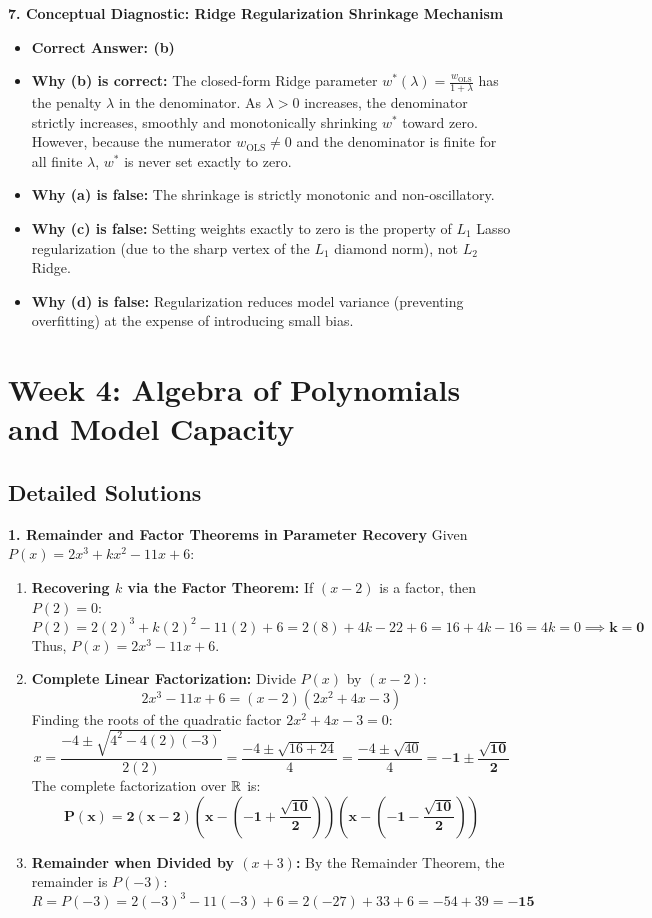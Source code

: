 \textbf{7. Conceptual Diagnostic: Ridge Regularization Shrinkage Mechanism}
\begin{itemize}
    \item \textbf{Correct Answer: (b)}
    \item \textbf{Why (b) is correct:} The closed-form Ridge parameter $w^*(\lambda) = \frac{w_{\text{OLS}}}{1 + \lambda}$ has the penalty $\lambda$ in the denominator. As $\lambda > 0$ increases, the denominator strictly increases, smoothly and monotonically shrinking $w^*$ toward zero. However, because the numerator $w_{\text{OLS}} \neq 0$ and the denominator is finite for all finite $\lambda$, $w^*$ is never set exactly to zero.
    \item \textbf{Why (a) is false:} The shrinkage is strictly monotonic and non-oscillatory.
    \item \textbf{Why (c) is false:} Setting weights exactly to zero is the property of $L_1$ Lasso regularization (due to the sharp vertex of the $L_1$ diamond norm), not $L_2$ Ridge.
    \item \textbf{Why (d) is false:} Regularization reduces model variance (preventing overfitting) at the expense of introducing small bias.
\end{itemize}

\section*{Week 4: Algebra of Polynomials and Model Capacity}

\subsection*{Detailed Solutions}

\textbf{1. Remainder and Factor Theorems in Parameter Recovery}
Given $P(x) = 2x^3 + k x^2 - 11x + 6$:
\begin{enumerate}
    \item \textbf{Recovering $k$ via the Factor Theorem:}
    If $(x - 2)$ is a factor, then $P(2) = 0$:
    $$P(2) = 2(2)^3 + k(2)^2 - 11(2) + 6 = 2(8) + 4k - 22 + 6 = 16 + 4k - 16 = 4k = 0 \implies \mathbf{k = 0}$$
    Thus, $P(x) = 2x^3 - 11x + 6$.
    \item \textbf{Complete Linear Factorization:}
    Divide $P(x)$ by $(x - 2)$:
    $$2x^3 - 11x + 6 = (x - 2)(2x^2 + 4x - 3)$$
    Finding the roots of the quadratic factor $2x^2 + 4x - 3 = 0$:
    $$x = \frac{-4 \pm \sqrt{4^2 - 4(2)(-3)}}{2(2)} = \frac{-4 \pm \sqrt{16 + 24}}{4} = \frac{-4 \pm \sqrt{40}}{4} = \mathbf{-1 \pm \frac{\sqrt{10}}{2}}$$
    The complete factorization over $\mathbb{R}$ is:
    $$\mathbf{P(x) = 2(x - 2)\left(x - \left(-1 + \frac{\sqrt{10}}{2}\right)\right)\left(x - \left(-1 - \frac{\sqrt{10}}{2}\right)\right)}$$
    \item \textbf{Remainder when Divided by $(x + 3)$:}
    By the Remainder Theorem, the remainder is $P(-3)$:
    $$R = P(-3) = 2(-3)^3 - 11(-3) + 6 = 2(-27) + 33 + 6 = -54 + 39 = \mathbf{-15}$$
\end{enumerate}


